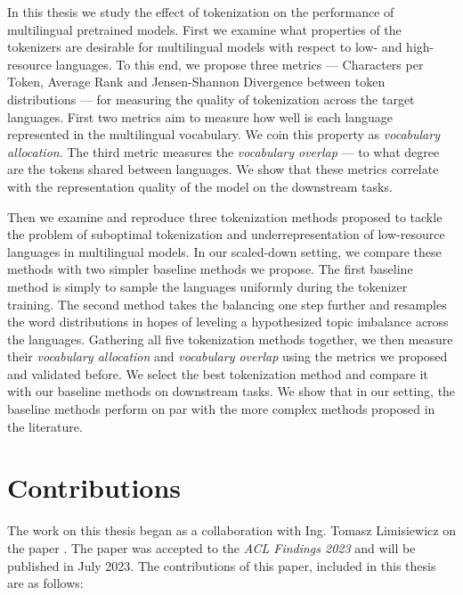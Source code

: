 In this thesis we study the effect of tokenization on the performance of multilingual pretrained models. First we examine what properties of the tokenizers are desirable for multilingual models with respect to low- and high- resource languages. To this end, we propose three metrics --- Characters per Token, Average Rank and Jensen-Shannon Divergence between token distributions --- for measuring the quality of tokenization across the target languages. First two metrics aim to measure how well is each language represented in the multilingual vocabulary. We coin this property as \textit{vocabulary allocation}. The third metric measures the \textit{vocabulary overlap} --- to what degree are the tokens shared between languages. We show that these metrics correlate with the representation quality of the model on the downstream tasks. 

Then we examine and reproduce three tokenization methods \citep{chung_improving_2020,zheng_allocating_2021,liang_xlm-v_2023} proposed to tackle the problem of suboptimal tokenization and underrepresentation of low-resource languages in multilingual models. In our scaled-down setting, we compare these methods with two simpler baseline methods we propose. The first baseline method  is simply to sample the languages uniformly during the tokenizer training. The second method  takes the balancing one step further and resamples the word distributions in hopes of leveling a hypothesized topic imbalance across the languages. 
Gathering all five tokenization methods together, we then measure their \textit{vocabulary allocation} and \textit{vocabulary overlap} using the metrics we proposed and validated before. We select the best tokenization method and compare it with our baseline methods on downstream tasks. We show that in our setting, the baseline methods perform on par with the more complex methods proposed in the literature.


\section{Contributions}

The work on this thesis began as a collaboration with Ing. Tomasz Limisiewicz on the paper . The paper was accepted to the \textit{ACL Findings 2023} and will be published in July 2023. The contributions of this paper, included in this thesis are as follows:

